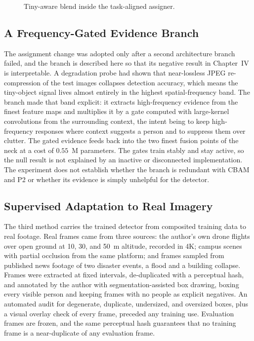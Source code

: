 \documentclass[12pt,a4paper,oneside]{report}
\begin{document}
\begin{figure}[tbp]
  \centering
  \caption{Tiny-aware blend inside the task-aligned assigner.}
  \label{fig:assignmech}
\end{figure}

\subsection{A Frequency-Gated Evidence Branch}
\label{sec:fccgmethod}
The assignment change was adopted only after a second architecture branch
failed, and the branch is described here so that its negative result in
Chapter~IV is interpretable. A degradation probe had shown that near-lossless
JPEG re-compression of the test images collapses detection accuracy, which
means the tiny-object signal lives almost entirely in the highest
spatial-frequency band. The branch made that band explicit: it extracts
high-frequency evidence from the finest feature maps and multiplies it by a
gate computed with large-kernel convolutions from the surrounding context, the
intent being to keep high-frequency responses where context suggests a person
and to suppress them over clutter. The gated evidence feeds back into the two
finest fusion points of the neck at a cost of $0.55$~M parameters. The gates
train stably and stay active, so the null result is not explained by an
inactive or disconnected implementation. The experiment does not establish
whether the branch is redundant with CBAM and P2 or whether its evidence is
simply unhelpful for the detector.

\subsection{Supervised Adaptation to Real Imagery}
\label{sec:adaptmethod}
The third method carries the trained detector from composited training data to
real footage. Real frames came from three sources: the author's own drone
flights over open ground at 10, 30, and 50~m altitude, recorded in 4K; campus
scenes with partial occlusion from the same platform; and frames sampled from
published news footage of two disaster events, a flood and a building
collapse. Frames were extracted at fixed intervals, de-duplicated with a
perceptual hash, and annotated by the author with segmentation-assisted box
drawing, boxing every visible person and keeping frames with no people as
explicit negatives. An automated audit for degenerate, duplicate, undersized,
and oversized boxes, plus a visual overlay check of every frame, preceded any
training use. Evaluation frames are frozen, and the same perceptual hash
guarantees that no training frame is a near-duplicate of any evaluation frame.
\end{document}
